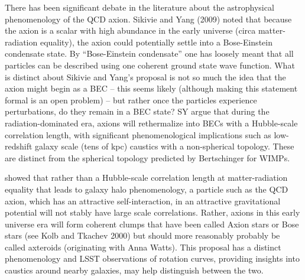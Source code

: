 
There has been significant debate in the literature about the astrophysical phenomenology of the QCD axion. Sikivie and Yang (2009) noted that because the axion is a scalar with high abundance in the early universe (circa matter-radiation equality), the axion could potentially settle into a Bose-Einstein condensate state. By ``Bose-Einstein condensate'' one has loosely meant that all particles can be described using one coherent ground state wave function. What is distinct about Sikivie and Yang's proposal is not so much the idea that the axion might begin as a BEC -- this seems likely (although making this statement formal is an open problem) -- but rather once the particles experience perturbations, do they remain in a BEC state? SY argue that during the radiation-dominated era, axions will rethermalize into BECs with a Hubble-scale correlation length, with significant phenomenological implications such as low-redshift galaxy scale (tens of kpc) caustics with a non-spherical topology. These are distinct from the spherical topology predicted by Bertschinger for WIMPs. 

\citet{1412.5930} showed that rather than a Hubble-scale correlation length at matter-radiation equality that leads to galaxy halo phenomenology, a particle such as the QCD axion, which has an attractive self-interaction, in an attractive gravitational potential will not stably have large scale correlations. Rather, axions in this early universe era will form coherent clumps that have been called Axion stars or Bose stars (see Kolb and Tkachev 2000) but should more reasonably probably be called axteroids (originating with Anna Watts). This proposal has a distinct phenomenology and LSST observations of rotation curves, providing insights into caustics around nearby galaxies, may help distinguish between the two.

